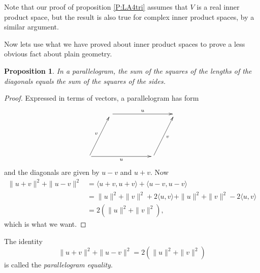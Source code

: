 \documentclass{article}
\theoremstyle{plain}
\newtheorem{proposition}[theorem]{Proposition}{\bfseries}{\itshape}
\begin{document}
Note that our proof of proposition \ref{P:LA4tri} assumes that $V$ is a real inner product space, but the result is also true for complex inner product spaces, by a similar argument.

Now lets use what we have proved about inner product spaces to prove a less obvious fact about plain geometry.

\begin{proposition}
In a parallelogram, the sum of the squares of the lengths of the diagonals equals the sum of the squares of the sides.
\end{proposition}
\begin{proof}
Expressed in terms of vectors, a parallelogram has form
\[\xymatrix{ &\ar[rrr]^u & & &\\
\\
\ar[ruu]^v\ar[rrr]_u & & &\ar[ruu]_v
}\]
and the diagonals are given by $u-v$ and $u+v$. Now
\begin{align*}
\|u+v\|^2 + \|u-v\|^2 &= \langle u+v, u+v \rangle + \langle u-v, u-v \rangle\\
&= \|u\|^2 + \|v\|^2 + 2\langle u, v \rangle +\|u\|^2 + \|v\|^2 -  2\langle u,v \rangle\\
&= 2(\|u\|^2 + \|v\|^2),
\end{align*}
which is what we want. 
\end{proof}

The identity
\[\|u+v\|^2 + \|u-v\|^2 = 2(\|u\|^2 + \|v\|^2)\]
is called the \emph{parallelogram equality}. 
\end{document}
